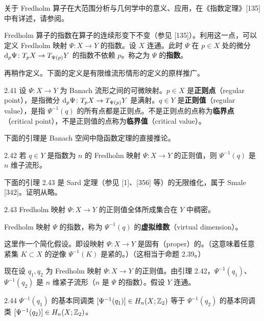 关于 Fredholm 算子在大范围分析与几何学中的意义、应用，在《指数定理》[135] 中有详述，请参阅。

Fredholm 算子的指数在算子的连续形变下不变（参见 [135]）。利用这一点，可以定义 Fredholm 映射 $\Psi\colon X\to Y$ 的指数。设 $X$ 连通。此时 $\Psi$ 在 $p\in X$ 处的微分 $\mathrm{d}_p\Psi\colon T_pX\to T_{\Psi(p)}Y$ 的指数不依赖 $p$。称之为 $\Psi$ 的\textbf{指数}。

再稍作定义。下面的定义是有限维流形情形的定义的原样推广。

\begin{definition}{2.41}
  设 $\Psi\colon X\to Y$ 为 Banach 流形之间的可微映射。$p\in X$ 是\textbf{正则点}（regular point），是指微分 $\mathrm{d}_p\Psi\colon T_pX\to T_{\Psi(p)}Y$ 是满射。$q\in Y$ 是\textbf{正则值}（regular value），是指 $\Psi^{-1}(q)$ 的所有点都是正则点。不是正则点的点称为\textbf{临界点}（critical point），不是正则值的点称为\textbf{临界值}（critical value）。
\end{definition}

下面的引理是 Banach 空间中隐函数定理的直接推论。

\begin{lemma}{2.42}
  若 $q\in Y$ 是指数为 $n$ 的 Fredholm 映射 $\Psi\colon X\to Y$ 的正则值，则 $\Psi^{-1}(q)$ 是 $n$ 维子流形。
\end{lemma}

下面的引理 2.43 是 Sard 定理（参见 [1]、[356] 等）的无限维化，属于 Smale [342]。证明从略。

\begin{lemma}{2.43}
  Fredholm 映射 $\Psi\colon X\to Y$ 的正则值全体所成集合在 $Y$ 中稠密。
\end{lemma}

Fredholm 映射 $\Psi$ 的指数，称为 $\Psi^{-1}(q)$ 的\textbf{虚拟维数}（virtual dimension）。

这里作一个简化假设。即设映射 $\Psi\colon X\to Y$ 是固有（proper）的。（这意味着任意紧集 $K\subset X$ 的逆像 $\Psi^{-1}(K)$ 是紧的。）（这相当于命题 2.39。）

现在设 $q_1,q_2$ 为 Fredholm 映射 $\Psi\colon X\to Y$ 的正则值。由引理 2.42，$\Psi^{-1}(q_1)$、$\Psi^{-1}(q_2)$ 是 $n$ 维紧子流形（$n$ 是 $\Psi$ 的指数）。假设 $Y$ 连通。

\begin{proposition}{2.44}
  $\Psi^{-1}(q_1)$ 的基本同调类 $[\Psi^{-1}(q_1)]\in H_n(X;\mathbb{Z}_2)$ 等于 $\Psi^{-1}(q_2)$ 的基本同调类 $[\Psi^{-1}(q_2)]\in H_n(X;\mathbb{Z}_2)$。
\end{proposition}


